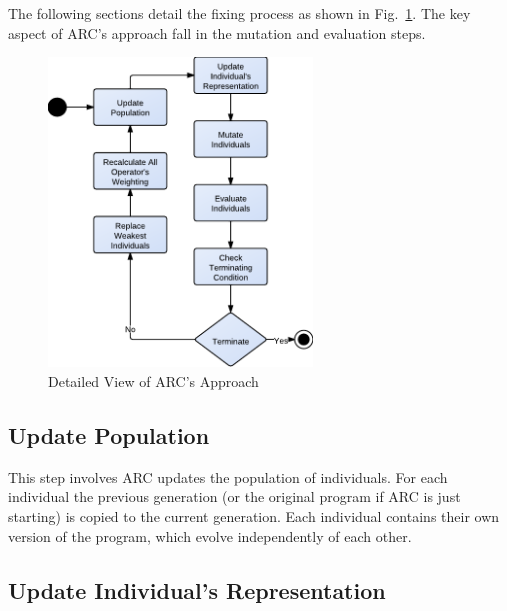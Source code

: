 \documentclass{llncs}
\begin{document}

The following sections detail the fixing process as shown in Fig.~\ref{fig:phases_internals}.
The key aspect of ARC's approach fall in the mutation and evaluation steps.

\begin{figure}[h]
  \centering
  \includegraphics[width=7cm]{figures/phases.pdf}
  \caption{Detailed View of ARC's Approach}
  \label{fig:phases_internals}
\end{figure}

\subsection{Update Population}
\label{sec:update_population}

This step involves ARC updates the population of individuals. For each
individual the previous generation (or the original program if ARC is just
starting) is copied to the current generation. Each individual contains their
own version of the program, which evolve independently of each other.


\subsection{Update Individual's Representation}
\label{sec:update_individual_representation}
\end{document}
